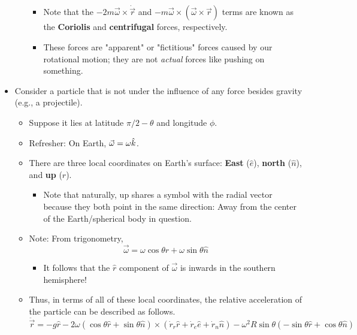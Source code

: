 \documentclass[../notes.tex]{subfiles}
\begin{document}
\begin{itemize}
\begin{itemize}
\begin{equation*}
        \end{equation*}
        \begin{itemize}
            \item Note that the $-2m\vec{\omega}\times\dot{\vec{r}}$ and $-m\vec{\omega}\times(\vec{\omega}\times\vec{r})$ terms are known as the \textbf{Coriolis} and \textbf{centrifugal} forces, respectively.
            \item These forces are "apparent" or "fictitious" forces caused by our rotational motion; they are not \emph{actual} forces like pushing on something.
        \end{itemize}
    \end{itemize}
    \item Consider a particle that is not under the influence of any force besides gravity (e.g., a projectile).
    \begin{itemize}
        \item Suppose it lies at latitude $\pi/2-\theta$ and longitude $\phi$.
        \item Refresher: On Earth, $\vec{\omega}=\omega\hat{k}$.
        \item There are three local coordinates on Earth's surface: \textbf{East} ($\hat{e}$), \textbf{north} ($\hat{n}$), and \textbf{up} ($\hat{r}$).
        \begin{itemize}
            \item Note that naturally, up shares a symbol with the radial vector because they both point in the same direction: Away from the center of the Earth/spherical body in question.
        \end{itemize}
        \item Note: From trigonometry,
        \begin{equation*}
            \vec{\omega} = \omega\cos\theta\hat{r}+\omega\sin\theta\hat{n}
        \end{equation*}
        \begin{itemize}
            \item It follows that the $\hat{r}$ component of $\vec{\omega}$ is inwards in the southern hemisphere!
        \end{itemize}
        \item Thus, in terms of all of these local coordinates, the relative acceleration of the particle can be described as follows.
        \begin{equation*}
            \ddot{\vec{r}} = -g\hat{r}-2\omega(\cos\theta\hat{r}+\sin\theta\hat{n})\times(\dot{r}_r\hat{r}+\dot{r}_e\hat{e}+\dot{r}_n\hat{n})-\omega^2R\sin\theta(-\sin\theta\hat{r}+\cos\theta\hat{n})

\end{equation*}
\end{itemize}
\end{itemize}
\end{document}
